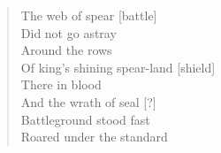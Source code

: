 \begin{paracol}{2}
\begin{quote}
        The web of spear [battle]\\
        Did not go astray \\
        Around the rows\\
        Of king's shining spear-land [shield]\\
        There in blood\\
        And the wrath of seal [?]\\
        Battleground stood fast\\
        Roared under the standard
    \end{quote}
\end{paracol}
\begin{translation*}{}
    \begin{parcolumns}[nofirstindent=true]{3}

\end{parcolumns}
\end{translation*}
